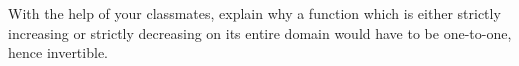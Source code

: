 {With the help of your classmates, explain why a function which is either strictly increasing or strictly decreasing on its entire domain would have to be one-to-one, hence invertible.}
{}